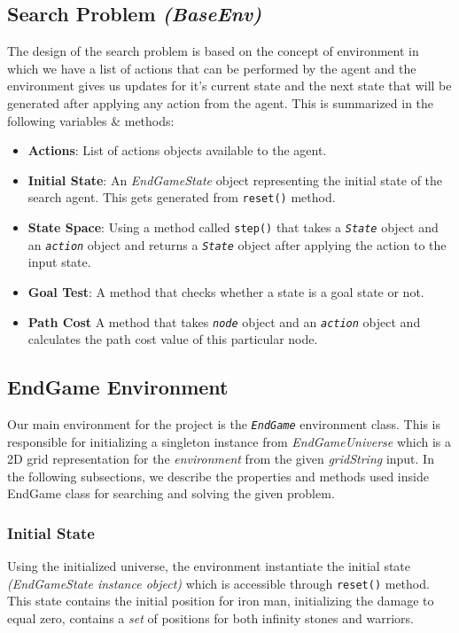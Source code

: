 \documentclass{article}
\newcommand{\code}[1]{\colorbox{codegray}{\texttt{#1}}}
\begin{document}
\subsection{Search Problem \textit{(BaseEnv)}}
The design of the search problem is based on the concept of environment in which we have a list of actions that can be performed by the agent and the environment gives us updates for it's current state and the next state that will be generated after applying any action from the agent. This is summarized in the following variables \& methods:
\begin{itemize}
  \item \textbf{Actions}: List of actions objects available to the agent.
\item \textbf{Initial State}: An \textit{EndGameState} object representing the initial state of the search agent. This gets generated from \code{reset()} method.
\item \textbf{State Space}: Using a method called \code{step()} that takes a \code{\textit{State}} object and an \code{\textit{action}} object and returns a \code{\textit{State}} object after applying the action to the input state.
\item \textbf{Goal Test}: A method that checks whether a state is a goal state or not.
\item \textbf{Path Cost} A method that takes \code{\textit{node}} object and an \code{\textit{action}} object and calculates the path cost value of this particular node.
\end{itemize}

\subsection{EndGame Environment}
Our main environment for the project is the \code{\textit{EndGame}} environment class. This is responsible for initializing a singleton instance from \textit{EndGameUniverse} which is a 2D grid representation for the \textit{environment} from the given \textit{gridString} input. In the following subsections, we describe the properties and methods used inside EndGame class for searching and solving the given problem.
\subsubsection{Initial State}
Using the initialized universe, the environment instantiate the initial state \textit{(EndGameState instance object)} which is accessible through \code{reset()} method. This state contains the initial position for iron man, initializing the damage to equal zero, contains a \textit{set} of positions for both infinity stones and warriors.
\end{document}
